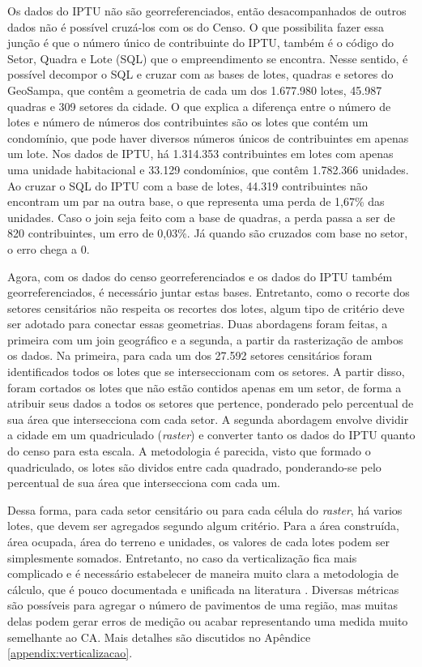 Os dados do IPTU não são georreferenciados, então desacompanhados de outros dados não é possível cruzá-los com os do Censo. O que possibilita fazer essa junção é que o número único de contribuinte do IPTU, também é o código do Setor, Quadra e Lote (SQL) que o empreendimento se encontra. Nesse sentido, é possível decompor o SQL e cruzar com as bases de lotes, quadras e setores do GeoSampa, que contêm a geometria de cada  um dos 1.677.980 lotes, 45.987 quadras e 309 setores da cidade. O que explica a diferença entre o número de lotes e número de números dos contribuintes são os lotes que contém um condomínio, que pode haver diversos números únicos de contribuintes em apenas um lote. Nos dados de IPTU, há 1.314.353 contribuintes em lotes com apenas uma unidade habitacional e 33.129 condomínios, que contêm 1.782.366 unidades. Ao cruzar o SQL do IPTU com a base de lotes, 44.319 contribuintes não encontram um par na outra base, o que representa uma perda de 1,67\% das unidades. Caso o join seja feito com a base de quadras, a perda passa a ser de 820 contribuintes, um erro de 0,03\%. Já quando são cruzados com base no setor, o erro chega a 0.

Agora, com os dados do censo georreferenciados e os dados do IPTU também georreferenciados, é necessário juntar estas bases. Entretanto, como o recorte dos setores censitários não respeita os recortes dos lotes, algum tipo de critério deve ser adotado para conectar essas geometrias. Duas abordagens foram feitas, a primeira com um join geográfico e a segunda, a partir da rasterização de ambos os dados. Na primeira, para cada um dos 27.592 setores censitários foram identificados todos os lotes que se interseccionam com os setores. A partir disso, foram cortados os lotes que não estão contidos apenas em um setor, de forma a atribuir seus dados a todos os setores que pertence, ponderado pelo percentual de sua área que intersecciona com cada setor. A segunda abordagem envolve dividir a cidade em um quadriculado (\textit{raster}) e converter tanto os dados do IPTU quanto do censo para esta escala. A metodologia é parecida, visto que formado o quadriculado, os lotes são dividos entre cada quadrado, ponderando-se pelo percentual de sua área que intersecciona com cada um.

Dessa forma, para cada setor censitário ou para cada célula do \textit{raster}, há varios lotes, que devem ser agregados segundo algum critério. Para a área construída, área ocupada, área do terreno e unidades, os valores de cada lotes podem ser simplesmente somados. Entretanto, no caso da verticalização fica mais complicado e é necessário estabelecer de maneira muito clara a metodologia de cálculo, que é pouco documentada e unificada na literatura \cite{ccalicskan2022morphological}. Diversas métricas são possíveis para agregar o número de pavimentos de uma região, mas muitas delas podem gerar erros de medição ou acabar representando uma medida muito semelhante ao CA. Mais detalhes são discutidos no Apêndice \ref{appendix:verticalizacao}.

